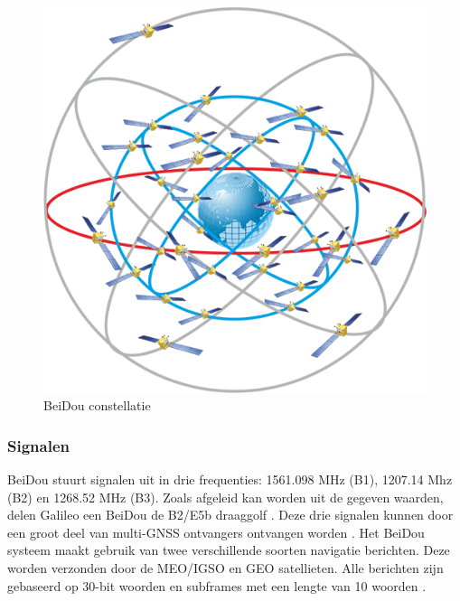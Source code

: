 \begin{figure}[hbp]
	\includegraphics[scale=0.45]{BeiDou.png}
	\centering
	\caption{BeiDou constellatie \cite{LImgBeiDou}}
	\label{imgBeiDou}
\end{figure} 

\subsubsection{Signalen}
BeiDou stuurt signalen uit in drie frequenties: 1561.098 MHz (B1), 1207.14 Mhz (B2) en 1268.52 MHz (B3). Zoals afgeleid kan worden uit de gegeven waarden, delen Galileo een BeiDou de B2/E5b draaggolf \cite{LBibPPP2,LBibBeiDou4}. Deze drie signalen kunnen door een groot deel van multi-GNSS ontvangers ontvangen worden \cite{LBibGNSS9}. Het BeiDou systeem maakt gebruik van twee verschillende soorten navigatie berichten. Deze worden verzonden door de MEO/IGSO en GEO satellieten. Alle berichten zijn gebaseerd op 30-bit woorden en subframes met een lengte van 10 woorden \cite{LBibBeiDou5}.  

